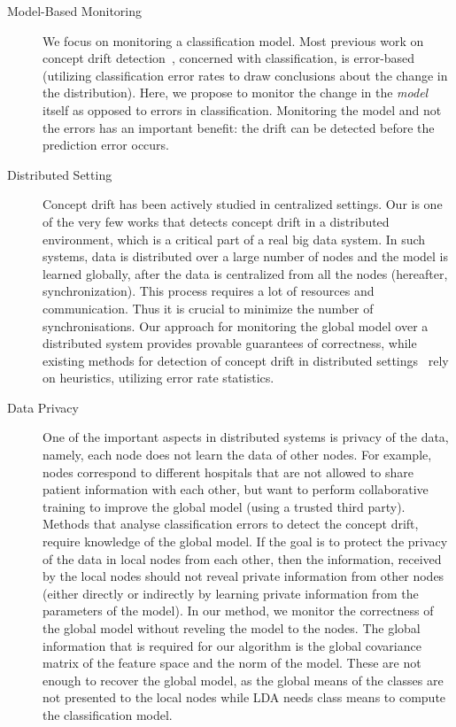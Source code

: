 \documentclass{sig-alternate-05-2015}
\begin{document}
\begin{description}
\item[Model-Based Monitoring] We focus on monitoring a classification model.
Most previous work on concept drift detection~\cite{baena2006early,gama2004learning,Nishida2007},
concerned with classification, is error-based  (utilizing classification error rates to
draw conclusions about the change in the distribution).
Here, we propose to monitor the change in the {\em model} itself as opposed to errors in classification.
Monitoring the model and not the errors has an important benefit: the drift can
be detected before the prediction error occurs.

\item[Distributed Setting]
    Concept drift has been actively studied in centralized settings.
    Our is one of the very few works \cite{AngGZPH13} that detects concept drift in a distributed
    environment, which is a critical part of a real big data system.
    In such systems, data is distributed over a large number of nodes and the model is learned
    globally, after the data is centralized from all the nodes (hereafter, synchronization).
    This process requires a lot of resources and communication.
    Thus it is crucial to minimize the number of synchronisations.
    Our approach for monitoring the global model over a distributed system
    provides provable guarantees of correctness, while existing methods for detection of concept
    drift in distributed settings~\cite{AngGZPH13} rely on heuristics, utilizing error rate statistics.

\item[Data Privacy]
    One of the important aspects in distributed systems is privacy of the data, namely, each node does not learn the data of other nodes. For example, nodes correspond to different hospitals that are not allowed to share patient information with each other, but want to perform collaborative training to improve the global model (using a trusted third party). Methods that analyse classification errors to detect the concept drift, require knowledge of the global model. If the goal is to protect the privacy of the data in local nodes from each other, then the information, received by the local nodes should not reveal private information from other nodes (either directly or indirectly by learning private information from the parameters of the model). In our method, we monitor the correctness of the global model without reveling the model to the nodes. The global information that is required for our algorithm is the global covariance matrix of the feature space and the norm of the model. These are not enough to recover the global model, as the global means of the classes are not presented to the local nodes while LDA needs class means to compute the classification model.
\end{description}
\end{document}
